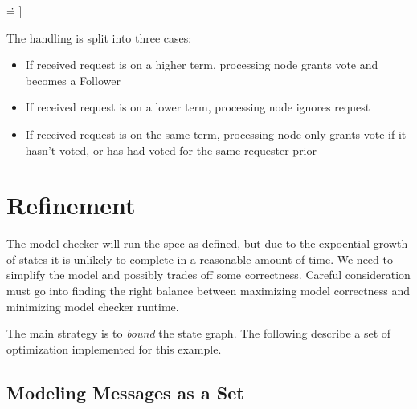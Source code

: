 \begin{tlatex}
{ \.{=} ]}%
 \@x{\@s{48.01} \.{\land} messages \.{'} \.{=} AddMessage ( [ fSrc \.{\mapsto}
 i ,\,}%
%
%
%
\@x{\@s{180.15} fSuccess \.{\mapsto} 1 ] ,\,}%
%
\end{tlatex}
\newline

The handling is split into three cases: 
\begin{itemize}
    \item If received request is on a higher term, processing node grants vote and becomes a Follower
    \item If received request is on a lower term, processing node ignores request
    \item If received request is on the same term, processing node only grants
    vote if it hasn't voted, or has had voted for the same requester prior 
\end{itemize}

\section{Refinement}

The model checker will run the spec as defined, but due to the expoential growth
of states it is unlikely to complete in a reasonable amount of time. We need to
simplify the model and possibly trades off some correctness. Careful
consideration must go into finding the right balance between maximizing model
correctness and minimizing model checker runtime.\newline

The main strategy is to \textit{bound} the state graph. The following describe a
set of optimization implemented for this example.

\subsection{Modeling Messages as a Set}

